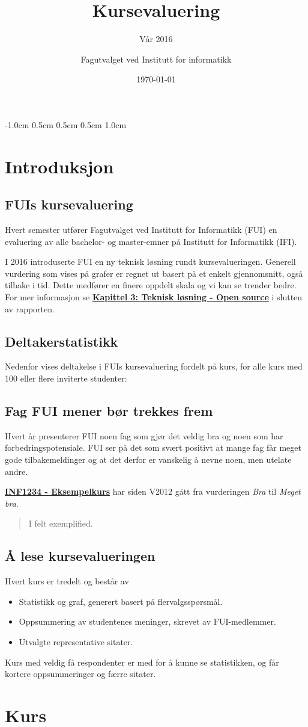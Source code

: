 \documentclass[norsk,a4paper,11pt]{report}
\author{Fagutvalget ved Institutt for informatikk}
\title{Kursevaluering}
\subtitle{Vår 2016}
\date{\today}
\begin{document}
\ififorside{}

\setlength{\topmargin}      {-1.0cm}
\setlength{\headsep}        {0.5cm}
\setlength{\oddsidemargin}  {0.5cm}
\setlength{\evensidemargin} {0.5cm}
\setlength{\footskip}       {1.0cm}
\renewcommand{\thesection}{}
\renewcommand{\thesubsection}{}
\tableofcontents
\newpage
\chapter{Introduksjon}
\label{chp:intro}
\section{FUIs kursevaluering}
Hvert semester utfører Fagutvalget ved Institutt for Informatikk (FUI) en evaluering av alle bachelor- og master-emner på Institutt for Informatikk (IFI).

I 2016 introduserte FUI en ny teknisk løsning rundt kursevalueringen.
Generell vurdering som vises på grafer er regnet ut basert på et enkelt gjennomsnitt, også tilbake i tid.
Dette medfører en finere oppdelt skala og vi kan se trender bedre.
For mer informasjon se \textbf{\hyperref[sec:OS]{Kapittel 3: Teknisk løsning - Open source}} i slutten av rapporten.

\section{Deltakerstatistikk}
Nedenfor vises deltakelse i FUIs kursevaluering fordelt på kurs, for alle kurs med 100 eller flere inviterte studenter:


\section{Fag FUI mener bør trekkes frem}
Hvert år presenterer FUI noen fag som gjør det veldig bra og noen som har forbedringspotensiale.
FUI ser på det som svært positivt at mange fag får meget gode tilbakemeldinger og at det derfor er vanskelig å nevne noen, men utelate andre.

\hyperref[course:INF1234]{\textbf{INF1234 - Eksempelkurs}} har siden V2012 gått fra vurderingen  \emph{Bra} til \emph{Meget bra}.

\begin{quote}
I felt exemplified.
\end{quote}

\section{Å lese kursevalueringen}
Hvert kurs er tredelt og består av
\begin{itemize}
    \item Statistikk og graf, generert basert på flervalgsspørsmål.
    \item Oppsummering av studentenes meninger, skrevet av FUI-medlemmer.
    \item Utvalgte representative sitater.
\end{itemize}
Kurs med veldig få respondenter er med for å kunne se statistikken, og får kortere oppsummeringer og færre sitater.

\newpage
\chapter{Kurs}
\label{chp:courses}
\newpage
\end{document}
